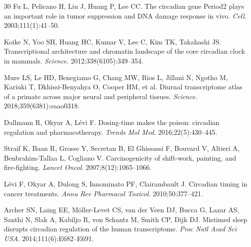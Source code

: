 \documentclass[11pt,letterpaper]{article}
\begin{document}
\begin{thebibliography}{30}
Fu L, Pelicano H, Liu J, Huang P, Lee CC.
The circadian gene Period2 plays an important role in tumor suppression and DNA damage response in vivo.
\textit{Cell}. 2003;111(1):41--50.

Koike N, Yoo SH, Huang HC, Kumar V, Lee C, Kim TK, Takahashi JS.
Transcriptional architecture and chromatin landscape of the core circadian clock in mammals.
\textit{Science}. 2012;338(6105):349--354.

Mure LS, Le HD, Benegiamo G, Chang MW, Rios L, Jillani N, Ngotho M, Kariuki T, Dkhissi-Benyahya O, Cooper HM, et al.
Diurnal transcriptome atlas of a primate across major neural and peripheral tissues.
\textit{Science}. 2018;359(6381):eaao0318.

Dallmann R, Okyar A, L\'{e}vi F.
Dosing-time makes the poison: circadian regulation and pharmacotherapy.
\textit{Trends Mol Med}. 2016;22(5):430--445.

Straif K, Baan R, Grosse Y, Secretan B, El Ghissassi F, Bouvard V, Altieri A, Benbrahim-Tallaa L, Cogliano V.
Carcinogenicity of shift-work, painting, and fire-fighting.
\textit{Lancet Oncol}. 2007;8(12):1065--1066.

L\'{e}vi F, Okyar A, Dulong S, Innominato PF, Clairambault J.
Circadian timing in cancer treatments.
\textit{Annu Rev Pharmacol Toxicol}. 2010;50:377--421.

Archer SN, Laing EE, M\"{o}ller-Levet CS, van der Veen DJ, Bucca G, Lazar AS, Santhi N, Slak A, Kabiljo R, von Schantz M, Smith CP, Dijk DJ.
Mistimed sleep disrupts circadian regulation of the human transcriptome.
\textit{Proc Natl Acad Sci USA}. 2014;111(6):E682--E691.

\end{thebibliography}
\end{document}
